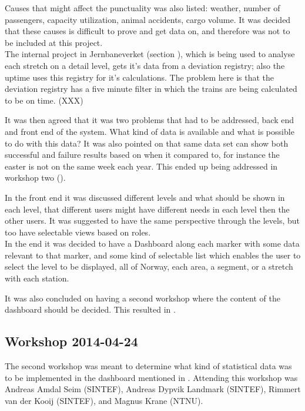 Causes that might affect the punctuality was also listed: weather, number of
passengers, capacity utilization, animal accidents, cargo volume.
It was decided that these causes is difficult to prove and get data on, and
therefore was not to be included at this project.\\

The internal project in Jernbaneverket (section
), which is being used to analyse each
stretch on a detail level, gets it's data from a deviation registry; also the
uptime uses this registry for it's calculations. The problem here is that the deviation registry has a five minute filter
in which the trains are being calculated to be on time. (XXX)

It was then agreed that it was two problems that had to be addressed, back end
and front end of the system. What kind of data is available and what is
possible to do with this data? It was also pointed on that same data set can 
show both successful and failure results based on when it compared to, for 
instance the easter is not on the same week each year. This ended up being 
addressed in workshop two (). 

In the front end it was discussed different levels and what should be shown in
each level, that different users might have different needs in each level then
the other users. It was suggested to have the same perspective through the
levels, but too have selectable views based on roles. \\

In the end it was decided to have a Dashboard along each marker with some data
relevant to that marker, and some kind of selectable list which enables the
user to select the level to be displayed, all of Norway, each area, a segment,
or a stretch with each station. 

It was also concluded on having a second workshop where the content of the
dashboard should be decided. This resulted in .


\clearpage
\subsection{Workshop 2014-04-24} %
\label{sub:workshop_2014_04_24}
The second workshop was meant to determine what kind of statistical data was 
to be implemented in the dashboard mentioned in .
Attending this workshop was Andreas Amdal Seim (SINTEF), Andreas Dypvik 
Landmark (SINTEF), Rimmert van der Kooij (SINTEF), and Magnus Krane (NTNU).\\

